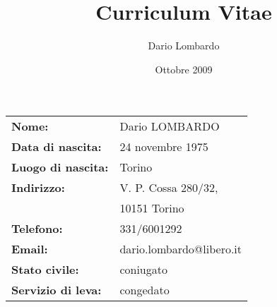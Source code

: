 \documentclass[a4paper, 10pt]{article}
\begin{document}
\author{Dario Lombardo}

\pagestyle{empty}

\title{Curriculum Vitae}
\date{Ottobre 2009}
\maketitle

\begin{center}
\begin{tabular}{l l}
	\textbf{Nome: } & Dario LOMBARDO\\
	\textbf{Data di nascita: } & 24 novembre 1975\\
	\textbf{Luogo di nascita: } & Torino\\
	\textbf{Indirizzo: } & V. P. Cossa 280/32, \\
				& 10151 Torino\\
	\textbf{Telefono: } & 331/6001292\\
	\textbf{Email: } & dario.lombardo@libero.it\\
	\textbf{Stato civile: } & coniugato\\
	\textbf{Servizio di leva: } & congedato\\
\end{tabular}
\end{center}

\ \\
\ \\
\end{document}
